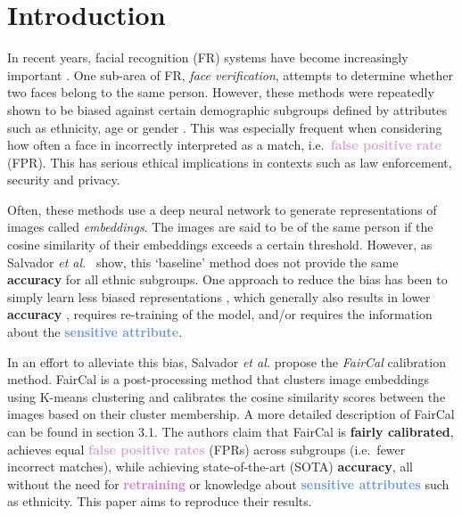 \section{Introduction}
In recent years, facial recognition (FR) systems have become increasingly important \citep{masi2018deep}. One sub-area of FR, \textit{face verification}, attempts to determine whether two faces belong to the same person. However, these methods were repeatedly shown to be biased against certain demographic subgroups defined by attributes such as ethnicity, age or gender \citep{pmlr-v81-buolamwini18a, https://doi.org/10.48550/arxiv.1809.02169}. This was especially frequent when considering how often a face in incorrectly interpreted as a match, i.e.\ \textcolor{Plum}{\textbf{false positive rate}} (FPR). This has serious ethical implications in contexts such as law enforcement, security and privacy.

Often, these methods use a deep neural network to generate representations of images called \textit{embeddings}. The images are said to be of the same person if the cosine similarity of their embeddings exceeds a certain threshold. However, as Salvador \textit{et al.}\ \citep{2106.03761} show, this `baseline' method does not provide the same \textcolor{Emerald}{\textbf{accuracy}} for all ethnic subgroups. One approach to reduce the bias has been to simply learn less biased representations \citep{https://doi.org/10.48550/arxiv.1905.06517, 9025595}, which generally also results in lower \textcolor{Emerald}{\textbf{accuracy}} \citep{https://doi.org/10.48550/arxiv.1911.08080}, requires re-training of the model, and/or requires the information about the \textcolor{CornflowerBlue}{\textbf{\textcolor{CornflowerBlue}{\textbf{sensitive attribute}}}}. 

In an effort to alleviate this bias, Salvador \textit{et al.} propose the \textit{FairCal} calibration method. FairCal is a post-processing method that clusters image embeddings using K-means clustering and calibrates the cosine similarity scores between the images based on their cluster membership. A more detailed description of FairCal can be found in section 3.1. The authors claim that FairCal is \textcolor{Bittersweet}{\textbf{fairly calibrated}}, achieves equal \textcolor{Plum}{\textbf{false positive rates}} (FPRs) across subgroups (i.e.\ fewer incorrect matches), while achieving state-of-the-art (SOTA) \textcolor{Emerald}{\textbf{accuracy}}, all without the need for \textcolor{Orchid}{\textbf{retraining}} or knowledge about \textcolor{CornflowerBlue}{\textbf{sensitive attributes}} such as ethnicity. This paper aims to reproduce their results.

